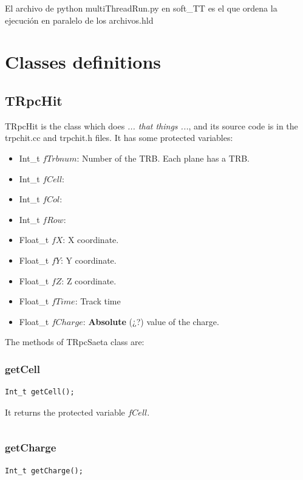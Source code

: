 \documentclass[a4paper]{book}
\begin{document}
El archivo de python multiThreadRun.py en soft\_TT es el que ordena la ejecución en paralelo de los archivos.hld

\section{Classes definitions}

\subsection{TRpcHit}

TRpcHit is the class which does \textit{... that things ...}, and its source code is in the trpchit.cc and trpchit.h files. It has some protected variables:

\begin{itemize}
    \item Int\_t $fTrbnum$: Number of the TRB. Each plane has a TRB.
    \item Int\_t $fCell$: 
    \item Int\_t $fCol$: 
    \item Int\_t $fRow$: 
    \item Float\_t $fX$: X coordinate.
    \item Float\_t $fY$: Y coordinate.
    \item Float\_t $fZ$: Z coordinate.
    \item Float\_t $fTime$: Track time
    \item Float\_t $fCharge$: \textbf{Absolute} (¿?) value of the charge.
\end{itemize}

The methods of TRpcSaeta class are:

\subsubsection{getCell}

\begin{lstlisting}[style=customc]
Int_t getCell();
\end{lstlisting}

It returns the protected variable $fCell$.

\[\]

\subsubsection{getCharge}

\begin{lstlisting}[style=customc]
Int_t getCharge();
\end{lstlisting}
\end{document}
